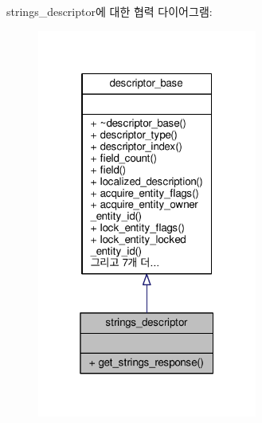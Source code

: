 strings\+\_\+descriptor에 대한 협력 다이어그램\+:
\nopagebreak
\begin{figure}[H]
\begin{center}
\leavevmode
\includegraphics[width=205pt]{classavdecc__lib_1_1strings__descriptor__coll__graph}
\end{center}
\end{figure}
